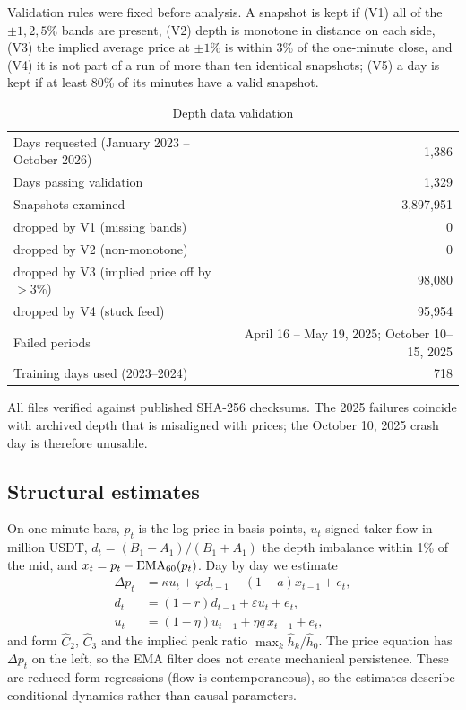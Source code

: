 Validation rules were fixed before analysis. A snapshot is kept if (V1) all of the $\pm1,2,5\%$ bands are present, (V2) depth is monotone in distance on each side, (V3) the implied average price at $\pm1\%$ is within 3\% of the one-minute close, and (V4) it is not part of a run of more than ten identical snapshots; (V5) a day is kept if at least 80\% of its minutes have a valid snapshot.

\begin{table}[t]\centering\small
\begin{threeparttable}
\caption{Depth data validation}\label{p2:tab:d2}
\begin{tabular}{lr}
\toprule
Days requested (January 2023 -- October 2026) & 1{,}386\\
Days passing validation & 1{,}329\\
Snapshots examined & 3{,}897{,}951\\
\quad dropped by V1 (missing bands) & 0\\
\quad dropped by V2 (non-monotone) & 0\\
\quad dropped by V3 (implied price off by $>3\%$) & 98{,}080\\
\quad dropped by V4 (stuck feed) & 95{,}954\\
Failed periods & April 16 -- May 19, 2025; October 10--15, 2025\\
Training days used (2023--2024) & 718\\
\bottomrule
\end{tabular}
\begin{tablenotes}\footnotesize\item All files verified against published SHA-256 checksums. The 2025 failures coincide with archived depth that is misaligned with prices; the October 10, 2025 crash day is therefore unusable. \end{tablenotes}
\end{threeparttable}
\end{table}

\subsection{Structural estimates}
On one-minute bars, $p_t$ is the log price in basis points, $u_t$ signed taker flow in million USDT, $d_t=(B_1-A_1)/(B_1+A_1)$ the depth imbalance within 1\% of the mid, and $x_t=p_t-{\rm EMA}_{60}(p_t)$. Day by day we estimate
\begin{align*}
\Delta p_t&=\kappa u_t+\varphi d_{t-1}-(1-a)x_{t-1}+e_t,\\
d_t&=(1-r)d_{t-1}+\varepsilon u_t+e_t,\\
u_t&=(1-\eta)u_{t-1}+\eta q\,x_{t-1}+e_t,
\end{align*}
and form $\hat C_2$, $\hat C_3$ and the implied peak ratio $\max_k\hat h_k/\hat h_0$. The price equation has $\Delta p_t$ on the left, so the EMA filter does not create mechanical persistence. These are reduced-form regressions (flow is contemporaneous), so the estimates describe conditional dynamics rather than causal parameters.

